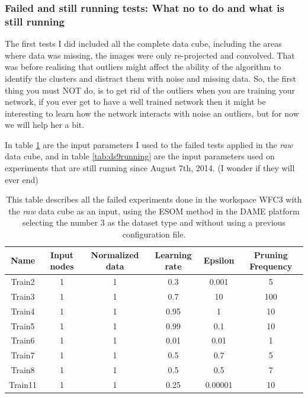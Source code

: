 \documentclass[11pt,fleqn]{book} %
\begin{document}
\subsubsection{Failed and still running tests: What no to do and what is still running}
The first tests I did included all the complete data cube, including the areas where data was missing, the images were only re-projected and convolved. That was before realising that outliers might affect the ability of the algorithm to identify the clusters and distract them with noise and missing data. So, the first thing you must NOT do, is to get rid of the outliers when you are training your network, if you ever get to have a well trained network then it might be interesting to learn how the network interacts with noise an outliers, but for now we will help her a bit. 

In table \ref{tab:ds9failed} are the input parameters I used to the failed tests applied in the \emph{raw} data cube, and in table \ref{tab:ds9running} are the input parameters used on experiments that are still running since August 7th, 2014. (I wonder if they will ever end)

\begin{table}[h!]
  \centering
    \begin{tabular}{ c c c c c c }
    \hline\hline
    
    Name & Input nodes & Normalized data & Learning rate & Epsilon & Pruning Frequency\\
    \hline
    
    Train2 & 1 & 1 & 0.3 & 0.001 & 5\\
    Train3 & 1 & 1 & 0.7 & 10 & 100\\
    Train4 & 1 & 1 & 0.95 & 1 & 10\\
    Train5 & 1 & 1 & 0.99 & 0.1 & 10\\
    Train6 & 1 & 1 & 0.01 & 0.01 & 1\\
    Train7 & 1 & 1 & 0.5 & 0.7 & 5\\
    Train8 & 1 & 1 & 0.5 & 0.5 & 7\\
    Train11 & 1 & 1 & 0.25 & 0.00001 & 10\\
    
    \hline
  \end{tabular}
  \caption{This table describes all the failed experiments done in the workspace WFC3 with the \emph{raw} data cube as an input, using the ESOM method in the DAME platform selecting the number 3 as the dataset type and without using a previous configuration file.}
  \label{tab:ds9failed}
\end{table}
\end{document}
